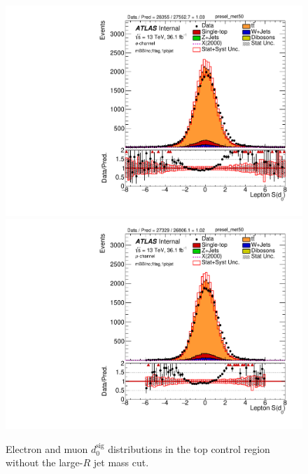 \begin{figure}[!htbp]
\begin{center}
\includegraphics[scale=0.33]{./figures/boosted/Leptond0Plots/DataMC_1tag_1pbjet_Inc_elec_presel_met50_Lep_d0sigL} 
\includegraphics[scale=0.33]{./figures/boosted/Leptond0Plots/DataMC_1tag_1pbjet_Inc_muon_presel_met50_Lep_d0sigL} 
\caption{Electron and muon $d_{0}^{\textrm{sig}}$ distributions in the top control region without the large-$R$ jet mass cut.}
\label{fig:syst_d0_topcr}
\end{center}
\end{figure}
 
